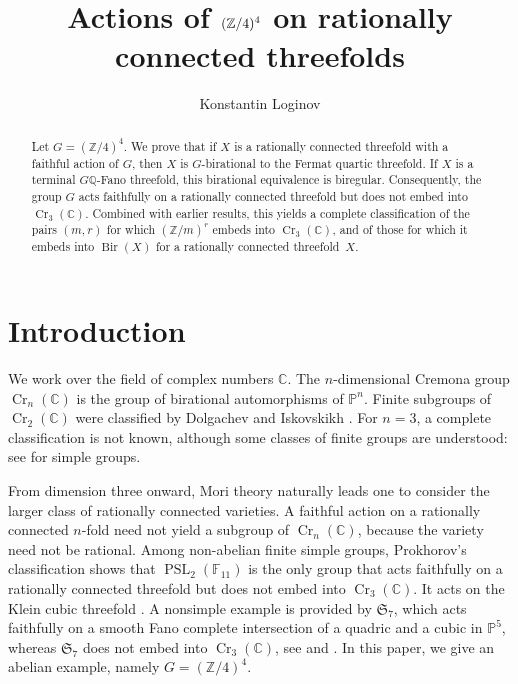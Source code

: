 \documentclass[10pt,oneside,reqno]{amsart}
\title{Actions of $(\Z/4)^4$ on rationally connected threefolds}
\author{Konstantin Loginov}
\date{}
\numberwithin{equation}{section}
\theoremstyle{definition}
\newcommand{\Z}{\mathbb Z}
\newcommand{\Q}{\mathbb Q}
\newcommand{\C}{\mathbb C}
\newcommand{\PP}{\mathbb P}
\newcommand{\Cr}{\operatorname{Cr}}
\begin{document}
\begin{abstract}
Let $G=(\Z/4)^4$. We prove that if $X$ is a rationally connected
threefold with a faithful action of $G$, then $X$ is
$G$-birational to the Fermat quartic threefold.  If $X$ is a terminal
$G\Q$-Fano threefold, this birational equivalence is biregular.
Consequently, the group $G$ acts faithfully on a rationally
connected threefold but does not embed into $\Cr_3(\C)$.  Combined
with earlier results, this yields a complete classification of the
pairs $(m,r)$ for which $(\Z/m)^r$ embeds into $\Cr_3(\C)$, and of
those for which it embeds into $\operatorname{Bir}(X)$ for a
rationally connected threefold~$X$.
\end{abstract}

\let\oldemptyset\emptyset
\let\emptyset\varnothing

\renewcommand{\familydefault}{\rmdefault}
\newcommand{\Addresses}{{%
  \bigskip
  \footnotesize

  \
    \

\textsc{Steklov Mathematical Institute of the Russian Academy of
Sciences, Moscow, Russia, \\Centre of Pure Mathematics, MIPT, Moscow, Russia}
 \\
  \textit{E-mail:} \texttt{loginov@mi-ras.ru}
}}

\maketitle

\section{Introduction}

We work over the field of complex numbers $\C$.  The $n$-dimensional Cremona group
$\Cr_n(\C)$ is the group of birational automorphisms of $\PP^n$.
Finite subgroups of $\Cr_2(\C)$ were classified by
Dolgachev and Iskovskikh \cite{DolgachevIskovskikh}.  For $n=3$, a
complete classification is not known, although some
classes of finite groups are understood: see 
\cite{ProkhorovSimple} for simple groups.

From dimension three onward, Mori theory naturally leads one to
consider the larger class of rationally connected varieties.  A
faithful action on a rationally connected $n$-fold need not yield a
subgroup of $\Cr_n(\C)$, because the variety need not be rational.
Among non-abelian finite simple groups,
Prokhorov's classification shows that $\operatorname{PSL}_2(\mathbb
F_{11})$ is the only group that acts faithfully on a rationally
connected threefold but does not embed into $\Cr_3(\C)$. It acts on the
Klein cubic threefold
\cite[Theorems 1.3, 1.5 and Example 2.6]{ProkhorovSimple}.  A nonsimple
example is provided by $\mathfrak S_7$, which acts
faithfully on a smooth
Fano complete intersection of a quadric and a cubic in $\PP^5$, whereas
$\mathfrak S_7$ does not embed into $\Cr_3(\C)$, see
\cite{BeauvilleSextic} and
\cite[Proposition 1.1]{ProkhorovSymmetric}.  In this paper, we give an
abelian example, namely $G=(\Z/4)^4$.
\end{document}
